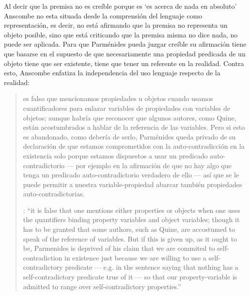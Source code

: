 Al decir que la premisa no es creíble porque es \enquote*{es acerca de nada en absoluto} Anscombe no esta situada desde la comprensión del lenguaje como representación, es decir, no está afirmando que la premisa no representa un objeto posible, sino que está criticando que la premisa misma no dice nada, no puede ser aplicada.
Para que Parménides pueda juzgar creíble su afirmación tiene que basarse en el supuesto de que necesariamente una propiedad predicada de un objeto tiene que ser existente, tiene que tener un referente en la realidad. 
Contra esto, Anscombe enfatiza la independencia del uso lenguaje respecto de la realidad: \blockquote[{\Cite[5]{anscombe1981parmenides:pmc}}: \enquote{it is false that one mentions either properties or objects when one uses the quantifiers binding property variables and object variables; though it has to be granted that some authors, such as Quine, are accostumed to speak of the reference of variables. But if this is given up, as it ought to be, Parmenides is deprived of his claim that we are commited to self-contradiction in existence just because we are willing to use a self-contradictory predicate --- e.g. in the sentence saying that nothing has a self-contradictory predicate true of it --- so that our property-variable is admitted to range over self-contradictory properties.}]{es falso que mencionamos propiedades u objetos cuando usamos cuantificadores para enlazar variables de propiedades con variables de objetos; aunque habría que reconocer que algunos autores, como Quine, están acostumbrados a hablar de la referencia de las variables. Pero si esto es abandonado, como debería de serlo, Parménides queda privado de su declaración de que estamos comprometidos con la auto-contradicción en la existencia solo porque estamos dispuestos a usar un predicado auto-contradictorio --- por ejemplo en la afirmación de que no hay algo que tenga un predicado auto-contradictorio verdadero de ello --- así que se le puede permitir a nuestra variable-propiedad abarcar también propiedades auto-contradictorias.}

